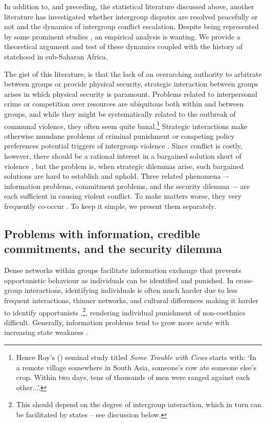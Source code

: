 In addition to, and preceding, the statistical literature discussed above,
another literature has investigated whether intergroup disputes are resolved
peacefully or not and the dynamics of intergroup conflict escalation. Despite
being represented by some prominent studies \citep{Fearon_1996,Lake_1996,
Fearon1995}, an empirical analysis is wanting. We provide a theoretical argument
and test of these dynamics coupled with the history of statehood in sub-Saharan
Africa.  

The gist of this literature, is that the lack of an overarching authority to
arbitrate between groups or provide physical security, strategic interaction
between groups arises in which physical security is paramount. Problems related
to interpersonal crime or competition over resources are ubiquitous both within
and between groups, and while they might be systematically related to the
outbreak of communal violence, they often seem quite banal.\footnote{Hence Roy's
	(\citeyear[1]{roy1994some}) seminal study titled \textit{Some Trouble
with Cows} starts with: `In a remote village somewhere in South Asia, someone's
cow ate someone else's crop. Within two days, tens of thousands of men were
ranged against each other...'.} Strategic interactions make otherwise mundane
problems of criminal punishment or competing policy preferences potential
triggers of intergroup violence \citep{diamond2013world, Eaton_2008, Fearon1995,
Fearon_1996, Lake_1996}. Since conflict is costly, however, there should be a
rational interest in a bargained solution short of violence \citep{Fearon1995},
but the problem is, when strategic dilemmas arise, such bargained solutions are
hard to establish and uphold. Three related phenomena –- information problems,
commitment problems, and the security dilemma –- are each sufficient in causing
violent conflict. To make matters worse, they very frequently co-occur
\citep[46]{Lake_1996}. To keep it simple, we present them separately.

\subsection{Problems with information, credible commitments, and the security
dilemma}
\label{Problems with information, credible commitments, and the security
dilemma}

Dense networks within groups facilitate information exchange that
prevents opportunistic behaviour as individuals can be identified and
punished. In cross-group interactions, identifying individuals is often much
harder due to less frequent interactions, thinner networks, and cultural
differences making it harder to identify opportunists
\citep[719]{Fearon_1996}.\footnote{This should depend on the degree of
	intergroup interaction, which in turn can be facilitated by states –
see discussion below.}, rendering individual punishment of non-coethnics
difficult. Generally, information problems tend to grow more acute with
increasing state weakness \citep[46]{Fearon1995, Lake_1996}.

